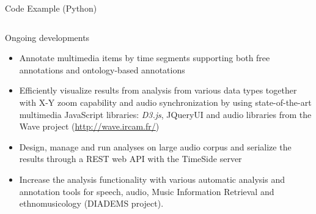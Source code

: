 \documentclass[final, hyperref, table]{beamer}
\begin{document}
\begin{frame}[containsverbatim]{}
\begin{columns}[T]
\begin{column}[T]{.49\linewidth}
\begin{block}{Code Example (Python)}
\begin{columns}[T]
  \begin{column}[T]{0.35\linewidth}
  \end{column}
\end{columns}
  \end{block}

  \begin{block}{Ongoing developments}
\vspace{-1cm}
    \begin{multicols}{2}[]
        \begin{itemize}
        \item \alert{Annotate} multimedia items by time segments supporting both free annotations and ontology-based annotations
        \item Efficiently \alert{visualize} results from analysis from various data types together with X-Y zoom capability and audio synchronization by using state-of-the-art multimedia JavaScript libraries: \emph{D3.js}, JQueryUI and audio libraries from the Wave project (\url{http://wave.ircam.fr/})
        \item Design, manage and run analyses on large audio corpus and serialize the results through a REST web API with the TimeSide server
        \item Increase the analysis functionality with various automatic analysis and annotation tools for speech, audio, Music Information Retrieval and ethnomusicology (DIADEMS project).


\end{itemize}
\end{multicols}
\end{block}
\end{column}
\end{columns}
\end{frame}
\end{document}
